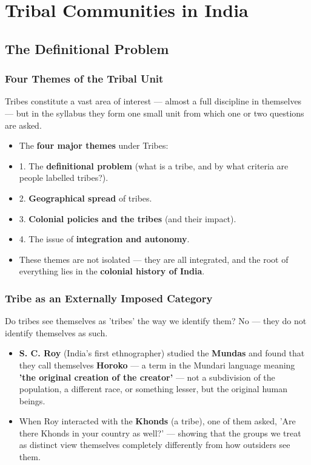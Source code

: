 \chapter{Tribal Communities in India}

\section{The Definitional Problem}

\subsection{Four Themes of the Tribal Unit}

Tribes constitute a vast area of interest --- almost a full discipline in themselves --- but in the syllabus they form one small unit from which one or two questions are asked.

\begin{KeyConcept}
\begin{itemize}
\item The \textbf{four major themes} under Tribes:
\item 1. The \textbf{definitional problem} (what is a tribe, and by what criteria are people labelled tribes?).
\item 2. \textbf{Geographical spread} of tribes.
\item 3. \textbf{Colonial policies and the tribes} (and their impact).
\item 4. The issue of \textbf{integration and autonomy}.
\item These themes are not isolated --- they are all integrated, and the root of everything lies in the \textbf{colonial history of India}.
\end{itemize}
\end{KeyConcept}

\subsection{Tribe as an Externally Imposed Category}

Do tribes see themselves as 'tribes' the way we identify them? No --- they do not identify themselves as such.

\begin{ExampleBox}
\begin{itemize}
\item \textbf{S. C. Roy} (India's first ethnographer) studied the \textbf{Mundas} and found that they call themselves \textbf{Horoko} --- a term in the Mundari language meaning \textbf{'the original creation of the creator'} --- not a subdivision of the population, a different race, or something lesser, but the original human beings.
\item When Roy interacted with the \textbf{Khonds} (a tribe), one of them asked, 'Are there Khonds in your country as well?' --- showing that the groups we treat as distinct view themselves completely differently from how outsiders see them.
\end{itemize}
\end{ExampleBox}

